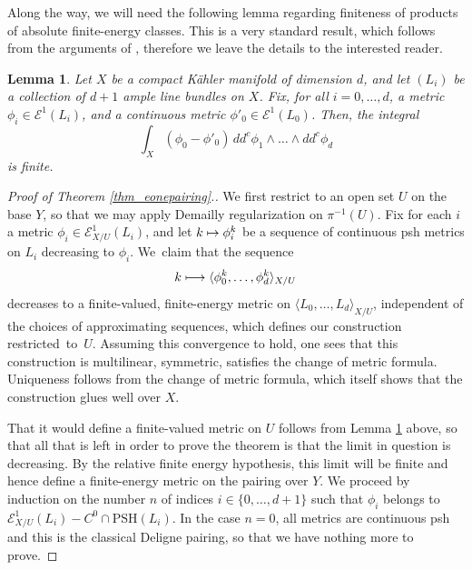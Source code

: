 \documentclass[JEP,XML,SOM,Unicode,NoEqCountersInSection,published]{cedram}
\def\mto{\mathchoice{\longmapsto}{\mapsto}{\mapsto}{\mapsto}}
\newtheorem{lemma}[theorem]{Lemma}
\theoremstyle{definition}
\newcommand\cE{\mathcal{E}}
\newcommand\mi{^{-1}}
\newcommand\PSH{\mathrm{PSH}}
\begin{document}
Along the way, we will need the following lemma regarding finiteness of products of absolute finite-energy classes. This is a very standard result, which follows from \eg the arguments of \cite[Th.\,5.8]{bjtrivval21}, therefore we leave the details to the interested reader.
\begin{lemma}\label{lem_finitepairings}Let $X$ be a compact Kähler manifold of dimension $d$, and let $(L_i)$ be a collection of $d+1$ ample line bundles on $X$. Fix, for all $i=0,\dots,d$, a metric $\phi_i\in\cE^1(L_i)$, and a continuous metric $\phi'_0\in\cE^1(L_0)$. Then, the integral
\[
\int_X (\phi_0-\phi'_0)\,dd^c\phi_1\wedge\dots\wedge dd^c\phi_d
\]
is finite.
\end{lemma}
\begin{proof}[Proof of Theorem \ref{thm_eonepairing}.]
We first restrict to an open set $U$ on the base $Y$, so that we may apply Demailly regularization on $\pi\mi(U)$. Fix for each $i$ a metric $\phi_i\in\cE^1_{X/U}(L_i)$, and let $k\mto \phi_i^k$ be a sequence of continuous psh metrics on $L_i$ decreasing to $\phi_i$. We~claim that the sequence
\[
k\mto \langle \phi_0^k,\dots,\phi_d^k\rangle_{X/U}
\]
decreases to a finite-valued, finite-energy metric on $\langle L_0,\dots,L_d\rangle_{X/U}$, independent of the choices of approximating sequences, which defines our construction restricted~to~$U$. Assuming this convergence to hold, one sees that this construction is multilinear, symmetric, satisfies the change of metric formula. Uniqueness follows from the change of metric formula, which itself shows that the construction glues well over $X$.

That it would define a finite-valued metric on $U$ follows from Lemma \ref{lem_finitepairings} above, so that all that is left in order to prove the theorem is that the limit in question is decreasing. By the relative finite energy hypothesis, this limit will be finite and hence define a finite-energy metric on the pairing over $Y$. We proceed by induction on the number $n$ of indices $i\in\{0,\dots,d+1\}$ such that $\phi_i$ belongs to $\cE^1_{X/U}(L_i)-C^0\cap\PSH(L_i)$. In the case $n=0$, all metrics are continuous psh and this is the classical Deligne pairing, so that we have nothing more to prove.


\end{proof}
\end{document}
